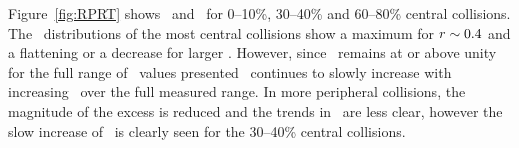 Figure~\ref{fig:RPRT} shows \RTheta\ and \RP\ for 0--10\%, 30--40\% and 60--80\% central collisions.  The \RTheta\ 
distributions of the most central collisions show a maximum for $\mbox{$r$} \sim 0.4$ and a flattening or a decrease for larger \rvar.
However, since \RTheta\ remains at or above unity for the full range of \rvar\ values presented \RP\ continues
to slowly increase with increasing \rvar\ over the full measured range.  In more peripheral collisions,
the magnitude of the excess is reduced and the trends in \RTheta\ are less clear, however the slow increase
of \RP\ is clearly seen for the 30--40\% central collisions.




\FloatBarrier
